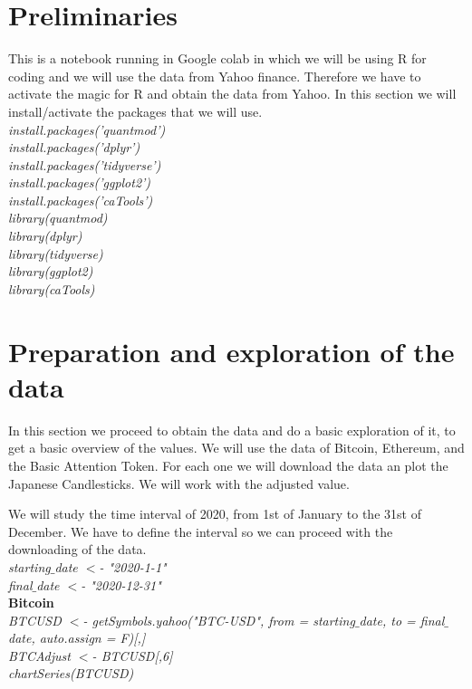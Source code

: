 \documentclass[14pt]{amsart}
\begin{document}
    \section{Preliminaries}\label{preliminaries}

This is a notebook running in Google colab in which we will be using R
for coding and we will use the data from Yahoo finance. Therefore we
have to activate the magic for R and obtain the data from Yahoo. In this
section we will install/activate the packages that we
will use.\\

\noindent \textit{install.packages('quantmod')}\\
\textit{install.packages('dplyr')}\\
\textit{install.packages('tidyverse')}\\
\textit{install.packages('ggplot2')}\\
\textit{install.packages('caTools')}\\
\textit{library(quantmod)}\\
\textit{library(dplyr)}\\
\textit{library(tidyverse)}\\
\textit{library(ggplot2)}\\
\textit{library(caTools)}


\section{Preparation and exploration of the data}\label{preparation-and-exploration-of-the-data}

In this section we proceed to obtain the data and do a basic exploration
of it, to get a basic overview of the values. We will use the data of
Bitcoin, Ethereum, and the Basic Attention Token. For each one we will
download the data an plot the Japanese Candlesticks. We will work with
the adjusted value.

We will study the time interval of 2020, from 1st of January to the 31st
of December. We have to define the interval so we can proceed with the
downloading of the data.\\

\noindent \textit{starting$\_$date $<$- "2020-1-1"}\\
\textit{final$\_$date $<$- "2020-12-31"}\\

{\bf Bitcoin}\\

\noindent \textit{BTCUSD $<$- getSymbols.yahoo("BTC-USD", from = starting$\_$date, to = final$\_$date, auto.assign = F)[,]}\\
\noindent \textit{BTCAdjust $<$- BTCUSD[,6]}\\
\noindent \textit{chartSeries(BTCUSD)}\\
\end{document}
